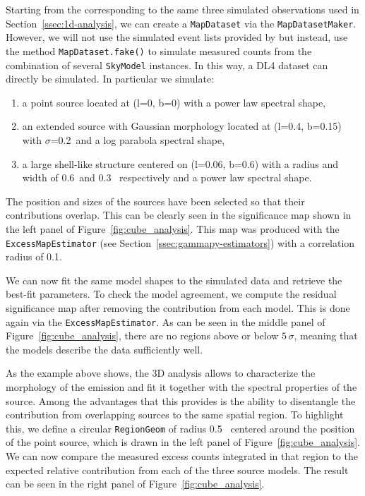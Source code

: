 \documentclass[longauth]{aa}
\newcommand{\code}[1]{\texttt{#1}}
\begin{document}
Starting from the \irfs corresponding to the same three simulated \cta
observations used in Section~\ref{ssec:1d-analysis}, we can create a \code{MapDataset}
via the \code{MapDatasetMaker}. However, we will not use the simulated event lists
provided by \cta but instead, use the method \code{MapDataset.fake()} to simulate
measured counts from the combination of several \code{SkyModel} instances. In this
way, a DL4 dataset can directly be simulated. In particular we simulate:
\begin{enumerate}
    \item a point source located at (l=0\textdegree, b=0\textdegree) with a power law
	      spectral shape,
    \item an extended source with Gaussian morphology located at (l=0.4\textdegree,
	      b=0.15\textdegree) with $\sigma$=0.2\textdegree~and a log parabola spectral
	      shape,
    \item a large shell-like structure centered on (l=0.06\textdegree,
	      b=0.6\textdegree) with a radius and width of 0.6\textdegree~and 0.3\textdegree~
	      respectively and a power law spectral shape.
\end{enumerate}

The position and sizes of the sources
have been selected so that their contributions overlap. This can be clearly
seen in the significance map shown in the left panel of
Figure~\ref{fig:cube_analysis}. This map was produced with the
\code{ExcessMapEstimator} (see Section~\ref{ssec:gammapy-estimators}) with a
correlation radius of 0.1\textdegree.

We can now fit the same model shapes to the simulated data and retrieve the
best-fit parameters. To check the model agreement, we compute the residual
significance map after removing the contribution from each model. This is done
again via the \code{ExcessMapEstimator}. As can be seen in the middle panel of
Figure~\ref{fig:cube_analysis}, there are no regions above or below $5\,\sigma$,
meaning that the models describe the data sufficiently well.

As the example above shows, the 3D analysis allows to characterize the
morphology of the emission and fit it together with the spectral properties of
the source.  Among the advantages that this provides is the ability to
disentangle the contribution from overlapping sources to the same spatial
region. To highlight this, we define a circular \code{RegionGeom} of radius
0.5\textdegree~ centered around the position of the point source, which is drawn
in the left panel of Figure~\ref{fig:cube_analysis}. We can now compare the
measured excess counts integrated in that region to the expected relative
contribution from each of the three source models. The result can be seen in the right
panel of Figure~\ref{fig:cube_analysis}.
\end{document}
